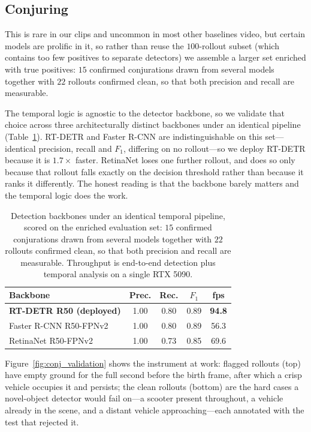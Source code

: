 \subsection{Conjuring}
\label{app:conj}

This is rare in our clips
and uncommon in most other baselines video, but certain models are prolific in it, so rather than reuse the
$100$-rollout subset (which contains too few positives to separate detectors) we assemble
a larger set enriched with true positives: $15$ confirmed
conjurations drawn from several models together with $22$ rollouts confirmed
clean, so that both precision and recall are measurable.

The temporal logic is agnostic to the detector backbone, so we validate that
choice across three architecturally distinct backbones under an identical
pipeline (Table~\ref{tab:val_conj}). RT-DETR and Faster R-CNN \cite{girshick2015fast}
are indistinguishable on this set---identical precision, recall and $F_1$, differing on no
rollout---so we deploy RT-DETR because it is $1.7\times$ faster. RetinaNet \cite{goyal2018focal}
loses one further rollout, and does so only because that rollout falls exactly on the decision
threshold rather than because it ranks it differently. The honest reading is that the backbone
barely matters and the temporal logic does the work.

\begin{table}[t]
\centering
{
\small
\begin{tabular}{lcccc}
\toprule
Backbone & Prec. & Rec. & $F_1$ & fps \\
\midrule
\textbf{RT-DETR R50 (deployed)} & 1.00 & 0.80 & 0.89 & \textbf{94.8} \\
Faster R-CNN R50-FPNv2          & 1.00 & 0.80 & 0.89 & 56.3 \\
RetinaNet R50-FPNv2             & 1.00 & 0.73 & 0.85 & 69.6 \\
\bottomrule
\end{tabular}
}
\caption{
    Detection backbones under an identical temporal pipeline, scored on the
    enriched evaluation set: $15$ confirmed conjurations drawn from several
    models together with $22$ rollouts confirmed clean, so that both precision
    and recall are measurable. Throughput is end-to-end detection plus temporal
    analysis on a single RTX 5090.
}
\label{tab:val_conj}
\end{table}

Figure~\ref{fig:conj_validation} shows the instrument at work: flagged rollouts
(top) have empty ground for the full second before the birth frame, after which a
crisp vehicle occupies it and persists; the clean rollouts (bottom) are the hard
cases a novel-object detector would fail on---a scooter present throughout, a
vehicle already in the scene, and a distant vehicle approaching---each annotated
with the test that rejected it.

